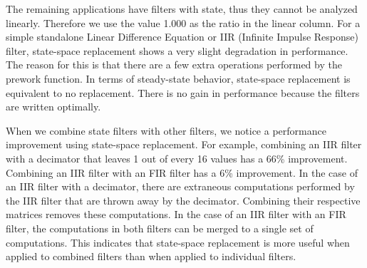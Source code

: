     The remaining applications have filters with state, thus they
cannot be analyzed linearly. Therefore we use the value 1.000 as
the ratio in the linear column. For a simple standalone Linear
Difference Equation or IIR (Infinite Impulse Response) filter,
state-space replacement shows a very slight degradation in
performance. The reason for this is that there are a few extra
operations performed by the prework function. In terms of
steady-state behavior, state-space replacement is equivalent to no
replacement. There is no gain in performance because the filters
are written optimally.

    When we combine state filters with other filters, we notice a
performance improvement using state-space replacement. For
example, combining an IIR filter with a decimator that leaves 1
out of every 16 values has a 66\% improvement. Combining an IIR
filter with an FIR filter has a 6\% improvement. In the case of an
IIR filter with a decimator, there are extraneous computations
performed by the IIR filter that are thrown away by the decimator.
Combining their respective matrices removes these computations. In
the case of an IIR filter with an FIR filter, the computations in
both filters can be merged to a single set of computations. This
indicates that state-space replacement is more useful when applied
to combined filters than when applied to individual filters.
